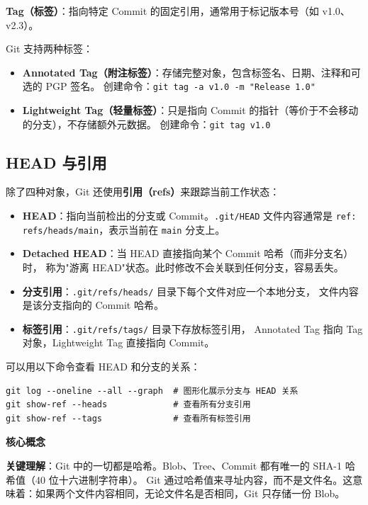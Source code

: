 \documentclass[12pt,a4paper,openany]{ctexbook}
\newenvironment{keybox}{%
  \medskip
  \noindent\textbf{\faKey\; 核心概念}
  \smallskip
}{%
  \medskip
}
\begin{document}
\begin{infobox}
\textbf{Tag（标签）}：指向特定 Commit 的固定引用，通常用于标记版本号（如 v1.0、v2.3）。

Git 支持两种标签：
\begin{itemize}[leftmargin=2em]
  \item \textbf{Annotated Tag（附注标签）}：存储完整对象，包含标签名、日期、注释和可选的 PGP 签名。
        创建命令：\texttt{git tag -a v1.0 -m "Release 1.0"}
  \item \textbf{Lightweight Tag（轻量标签）}：只是指向 Commit 的指针（等价于不会移动的分支），不存储额外元数据。
        创建命令：\texttt{git tag v1.0}
\end{itemize}
\end{infobox}

\subsection{HEAD 与引用}

除了四种对象，Git 还使用\textbf{引用（refs）}来跟踪当前工作状态：

\begin{itemize}[leftmargin=2em]
  \item \textbf{HEAD}：指向当前检出的分支或 Commit。\texttt{.git/HEAD} 文件内容通常是
        \texttt{ref: refs/heads/main}，表示当前在 \texttt{main} 分支上。
  \item \textbf{Detached HEAD}：当 HEAD 直接指向某个 Commit 哈希（而非分支名）时，
        称为"游离 HEAD"状态。此时修改不会关联到任何分支，容易丢失。
  \item \textbf{分支引用}：\texttt{.git/refs/heads/} 目录下每个文件对应一个本地分支，
        文件内容是该分支指向的 Commit 哈希。
  \item \textbf{标签引用}：\texttt{.git/refs/tags/} 目录下存放标签引用，
        Annotated Tag 指向 Tag 对象，Lightweight Tag 直接指向 Commit。
\end{itemize}

可以用以下命令查看 HEAD 和分支的关系：
\begin{lstlisting}[style=shell]
git log --oneline --all --graph  # 图形化展示分支与 HEAD 关系
git show-ref --heads             # 查看所有分支引用
git show-ref --tags              # 查看所有标签引用
\end{lstlisting}

\begin{keybox}
\textbf{关键理解}：Git 中的一切都是哈希。Blob、Tree、Commit 都有唯一的 SHA-1 哈希值（40 位十六进制字符串）。
Git 通过哈希值来寻址内容，而不是文件名。这意味着：如果两个文件内容相同，无论文件名是否相同，Git 只存储一份 Blob。
\end{keybox}
\end{document}
